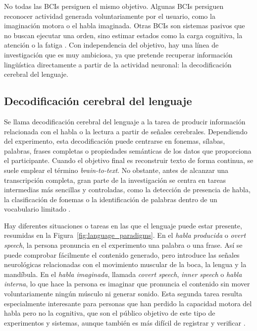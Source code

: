 No todas las BCIs persiguen el mismo objetivo. Algunas BCIs persiguen reconocer actividad generada voluntariamente por el usuario, como la imaginación motora o el habla imaginada. Otras BCIs son sistemas pasivos que no buscan ejecutar una orden, sino estimar estados como la carga cognitiva, la atención o la fatiga \cite{zander2011passive,edelman2025noninvasive}. Con independencia del objetivo, hay una línea de investigación que es muy ambiciosa, ya que pretende recuperar información lingüística directamente a partir de la actividad neuronal: la decodificación cerebral del lenguaje.

\subsection{Decodificación cerebral del lenguaje}

Se llama decodificación cerebral del lenguaje a la tarea de producir información relacionada con el habla o la lectura a partir de señales cerebrales. Dependiendo del experimento, esta decodificación puede centrarse en fonemas, sílabas, palabras, frases completas o propiedades semánticas de los datos que proporciona el participante. Cuando el objetivo final es reconstruir texto de forma continua, se suele emplear el término \textit{brain-to-text}. No obstante, antes de alcanzar una transcripción completa, gran parte de la investigación se centra en tareas intermedias más sencillas y controladas, como la detección de presencia de habla, la clasificación de fonemas o la identificación de palabras dentro de un vocabulario limitado \cite{ozdogan2025libribrain,jayalath2025unlocking}.

Hay diferentes situaciones o tareas en las que el lenguaje puede estar presente, resumidas en la Figura~\ref{fig:language_paradigms}. En el \textit{habla producida} o \textit{overt speech}, la persona pronuncia en el experimento una palabra o una frase. Así se puede comprobar fácilmente el contenido generado, pero introduce las señales neurológicas relacionadas con el movimiento muscular de la boca, la lengua y la mandíbula. En el \textit{habla imaginada}, llamada \textit{covert speech}, \textit{inner speech} o \textit{habla interna}, lo que hace la persona es imaginar que pronuncia el contenido sin mover voluntariamente ningún músculo ni generar sonido. Esta segunda tarea resulta especialmente interesante para personas que han perdido la capacidad motora del habla pero no la cognitiva, que son el público objetivo de este tipo de experimentos y sistemas, aunque también es más difícil de registrar y verificar \cite{panachakel2021covert,alzahrani2024systematic}.

